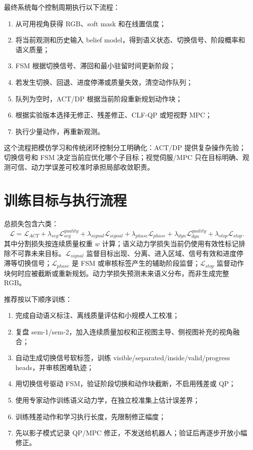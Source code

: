 \documentclass[UTF8,a4paper,11pt]{ctexart}
\begin{document}
最终系统每个控制周期执行以下流程：
\begin{enumerate}[leftmargin=2.3em]
  \item 从可用视角获得 RGB、soft mask 和在线置信度；
  \item 将当前观测和历史输入 belief model，得到语义状态、切换信号、阶段概率和语义质量；
  \item FSM 根据切换信号、滞回和最小驻留时间更新阶段；
  \item 若发生切换、回退、进度停滞或质量失效，清空动作队列；
  \item 队列为空时，ACT/DP 根据当前阶段重新规划动作块；
  \item 根据实验版本选择无修正、残差修正、CLF-QP 或短视野 MPC；
  \item 执行少量动作，再重新观测。
\end{enumerate}
这个流程把模仿学习和传统闭环控制分工明确化：ACT/DP 提供复杂操作先验；切换信号和 FSM 决定当前应优化哪个子目标；视觉伺服/MPC 只在目标明确、观测可信、动力学误差可校准时承担局部收敛职责。

\section{训练目标与执行流程}

总损失包含六类：
\begin{equation}
\mathcal L=\mathcal L_{ACT}
+\lambda_{seg}\mathcal L_{seg}^{quality}
+\lambda_{signal}\mathcal L_{signal}
+\lambda_{phase}\mathcal L_{phase}
+\lambda_{dyn}\mathcal L_{dyn}^{quality}
+\lambda_{stop}\mathcal L_{stop}.
\end{equation}
其中分割损失按连续质量权重 $w$ 计算；语义动力学损失当前仍使用有效性标记排除不可靠未来目标。$\mathcal L_{signal}$ 监督目标出现、分离、进入区域、信号有效和进度停滞等切换信号；$\mathcal L_{phase}$ 是 FSM 或审核标签产生的辅助阶段监督；$\mathcal L_{stop}$ 监督动作块何时应被截断或重新规划。动力学损失预测未来语义分布，而非生成完整 RGB。

推荐按以下顺序训练：
\begin{enumerate}[leftmargin=2.3em]
  \item 完成自动语义标注、离线质量评估和小规模人工校准；
  \item 复盘 sem-1/sem-2，加入连续质量加权和正视图主导、侧视图补充的视角融合；
  \item 自动生成切换信号软标签，训练 visible/separated/inside/valid/progress heads，并审核困难轨迹；
  \item 用切换信号驱动 FSM，验证阶段切换和动作块截断，不启用残差或 QP；
  \item 使用专家动作训练语义动力学，在独立校准集上估计误差界；
  \item 训练残差动作和学习执行长度，先限制修正幅度；
  \item 先以影子模式记录 QP/MPC 修正，不发送给机器人；验证后再逐步开放小幅修正。
\end{enumerate}
\end{document}
